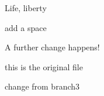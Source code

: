 \documentclass{article}
\begin{document}
Life, liberty
 
 add a space
 
 A further change happens!
 
 this is the original file%
 
 change from branch3 %
 
\end{document}
